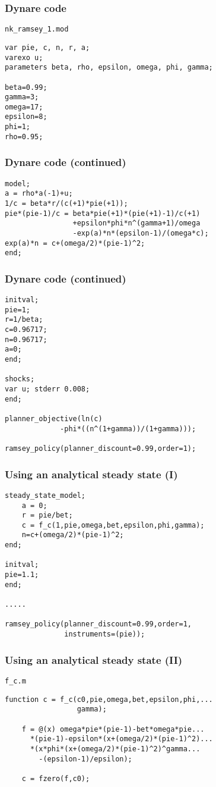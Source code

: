 \documentclass{beamer}
\begin{document}
\begin{frame}[fragile] \frametitle{Dynare code}
\verb+nk_ramsey_1.mod+
\begin{verbatim}
var pie, c, n, r, a;
varexo u;
parameters beta, rho, epsilon, omega, phi, gamma;

beta=0.99;
gamma=3;  
omega=17; 
epsilon=8;
phi=1;   
rho=0.95;
\end{verbatim}
\end{frame}

\begin{frame}[fragile] \frametitle{Dynare code (continued)}
\begin{verbatim}
model;
a = rho*a(-1)+u;
1/c = beta*r/(c(+1)*pie(+1)); 
pie*(pie-1)/c = beta*pie(+1)*(pie(+1)-1)/c(+1)
                +epsilon*phi*n^(gamma+1)/omega
                -exp(a)*n*(epsilon-1)/(omega*c);
exp(a)*n = c+(omega/2)*(pie-1)^2;
end;
\end{verbatim}
\end{frame}

\begin{frame}[fragile] \frametitle{Dynare code (continued)}
\begin{verbatim}
initval;
pie=1;
r=1/beta;
c=0.96717;
n=0.96717;
a=0;
end;

shocks;
var u; stderr 0.008;
end;

planner_objective(ln(c)
             -phi*((n^(1+gamma))/(1+gamma)));

ramsey_policy(planner_discount=0.99,order=1);

\end{verbatim}
\end{frame}

\begin{frame}[fragile]
  \frametitle{Using an analytical steady state (I)}
\begin{verbatim}
steady_state_model;
    a = 0;
    r = pie/bet;
    c = f_c(1,pie,omega,bet,epsilon,phi,gamma);
    n=c+(omega/2)*(pie-1)^2;
end;

initval;
pie=1.1;
end;

.....

ramsey_policy(planner_discount=0.99,order=1,
              instruments=(pie));
\end{verbatim}
\end{frame}

\begin{frame}[fragile]
  \frametitle{Using an analytical steady state (II)}
\verb+f_c.m+
\begin{verbatim}
function c = f_c(c0,pie,omega,bet,epsilon,phi,...
                 gamma); 
    
    f = @(x) omega*pie*(pie-1)-bet*omega*pie...
      *(pie-1)-epsilon*(x+(omega/2)*(pie-1)^2)...
      *(x*phi*(x+(omega/2)*(pie-1)^2)^gamma...
        -(epsilon-1)/epsilon);
    
    c = fzero(f,c0);
\end{verbatim}
\end{frame}
\end{document}
